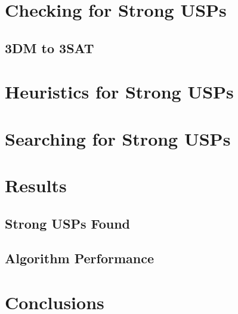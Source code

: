 \documentclass[11pt]{article}
\begin{document}
\section{Checking for Strong USPs}
\label{sec:check}

\subsection{3DM to 3SAT}
\label{subsec:3sat}

\section{Heuristics for Strong USPs}
\label{sec:heuristic}

\section{Searching for Strong USPs}
\label{sec:search}

\section{Results}
\label{sec:results}

\subsection{Strong USPs Found}
\label{subsec:usps_found}

\subsection{Algorithm Performance}
\label{subsec:performance}

\section{Conclusions}
\label{sec:conclusion}



 

\appendix
\end{document}

